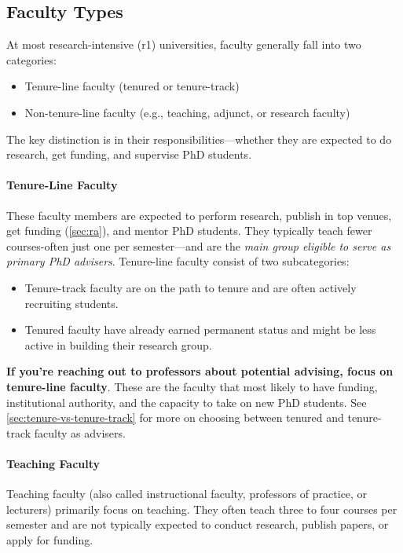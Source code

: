 \documentclass[oneside,11pt]{book}
\newenvironment{keybox}[1][]{
\small
  \begin{marker}[\faChessQueen{}]
    {\textbf{#1}}
  }{
  \end{marker}
}
\begin{document}
\subsection{Faculty Types}

At most research-intensive (\gls{r1}) universities, faculty generally fall into two categories:
\begin{itemize}
    \item Tenure-line faculty (tenured or tenure-track)
    \item Non-tenure-line faculty (e.g., teaching, adjunct, or research faculty)
\end{itemize}

The key distinction is in their responsibilities---whether they are expected to do research, get funding, and supervise PhD students.


\paragraph{Tenure-Line Faculty} 
These faculty members are expected to perform research, publish in top venues, get funding (\autoref{sec:ra}), and mentor PhD students. They typically teach fewer courses-often just one per semester—and are the \emph{main group eligible to serve as primary PhD advisers}. Tenure-line faculty consist of two subcategories:

\begin{itemize}
	\item Tenure-track faculty are on the path to tenure and are often actively recruiting students. 
	\item Tenured faculty have already earned permanent status and might be less active in building their research group.
\end{itemize}    

\begin{keybox}
\textbf{If you're reaching out to professors about potential advising, focus on tenure-line faculty}. These are the faculty that most likely to have funding, institutional authority, and the capacity to take on new PhD students. See \autoref{sec:tenure-vs-tenure-track} for more on choosing between tenured and tenure-track faculty as advisers.
\end{keybox}
\paragraph{Teaching Faculty}
Teaching faculty (also called instructional faculty, professors of practice, or lecturers) primarily focus on teaching. They often teach three to four courses per semester and are not typically expected to conduct research, publish papers, or apply for funding.
\end{document}
